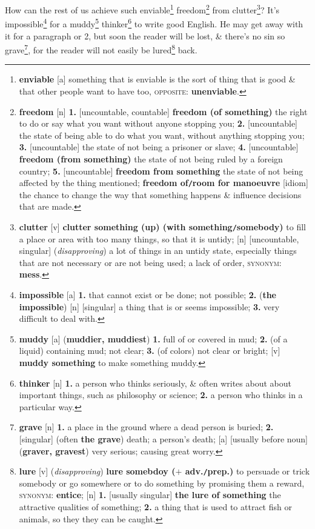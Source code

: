 \documentclass[oneside]{book}
\numberwithin{equation}{section}
\begin{document}
How can the rest of us achieve such enviable\footnote{\textbf{enviable} [a] something that is enviable is the sort of thing that is good \& that other people want to have too, \textsc{opposite}: \textbf{unenviable}.} freedom\footnote{\textbf{freedom} [n] \textbf{1.} [uncountable, countable] \textbf{freedom (of something)} the right to do or say what you want without anyone stopping you; \textbf{2.} [uncountable] the state of being able to do what you want, without anything stopping you; \textbf{3.} [uncountable] the state of not being a prisoner or slave; \textbf{4.} [uncountable] \textbf{freedom (from something)} the state of not being ruled by a foreign country; \textbf{5.} [uncountable] \textbf{freedom from something} the state of not being affected by the thing mentioned; \textbf{freedom of\texttt{/}room for manoeuvre} [idiom] the chance to change the way that something happens \& influence decisions that are made.} from clutter\footnote{\textbf{clutter} [v] \textbf{clutter something (up) (with something\texttt{/}somebody)} to fill a place or area with too many things, so that it is untidy; [n] [uncountable, singular] (\textit{disapproving}) a lot of things in an untidy state, especially things that are not necessary or are not being used; a lack of order, \textsc{synonym}: \textbf{mess}.}?   It's impossible\footnote{\textbf{impossible} [a] \textbf{1.} that cannot exist or be done; not possible; \textbf{2.} (\textbf{the impossible}) [n] [singular] a thing that is or seems impossible; \textbf{3.} very difficult to deal with.} for a muddy\footnote{\textbf{muddy} [a] (\textbf{muddier, muddiest}) \textbf{1.} full of or covered in mud; \textbf{2.} (of a liquid) containing mud; not clear; \textbf{3.} (of colors) not clear or bright; [v] \textbf{muddy something} to make something muddy.} thinker\footnote{\textbf{thinker} [n] \textbf{1.} a person who thinks seriously, \& often writes about about important things, such as philosophy or science; \textbf{2.} a person who thinks in a particular way.} to write good English. He may get away with it for a paragraph or 2, but soon the reader will be lost, \& there's no sin so grave\footnote{\textbf{grave} [n] \textbf{1.} a place in the ground where a dead person is buried; \textbf{2.} [singular] (often \textbf{the grave}) death; a person's death; [a] [usually before noun] (\textbf{graver, gravest}) very serious; causing great worry.}, for the reader will not easily be lured\footnote{\textbf{lure} [v] (\textit{disapproving}) \textbf{lure somebdoy ($+$ adv.\texttt{/}prep.)} to persuade or trick somebody or go somewhere or to do something by promising them a reward, \textsc{synonym}: \textbf{entice}; [n] \textbf{1.} [usually singular] \textbf{the lure of something} the attractive qualities of something; \textbf{2.} a thing that is used to attract fish or animals, so they they can be caught.} back.
\end{document}
